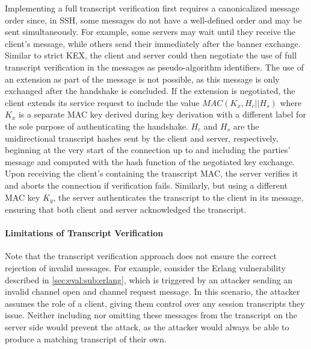 Implementing a full transcript verification first requires a canonicalized message order since, in SSH, some messages do not have a well-defined order and may be sent simultaneously. For example, some servers may wait until they receive the client's \msgkexinit message, while others send their \msgkexinit immediately after the banner exchange. Similar to strict KEX, the client and server could then negotiate the use of full transcript verification in the \msgkexinit messages as pseudo-algorithm identifiers. The use of an extension as part of the \msgextinfo message is not possible, as this message is only exchanged after the handshake is concluded. If the extension is negotiated, the client extends its service request to include the value $MAC(K_x, H_c || H_s)$ where $K_x$ is a separate MAC key derived during key derivation with a different label for the sole purpose of authenticating the handshake. $H_c$ and $H_s$ are the unidirectional transcript hashes sent by the client and server, respectively, beginning at the very start of the connection up to and including the parties' \msgnewkeys message and computed with the hash function of the negotiated key exchange. Upon receiving the client's \msgservicerequest containing the transcript MAC, the server verifies it and aborts the connection if verification fails. Similarly, but using a different MAC key $K_y$, the server authenticates the transcript to the client in its \msgserviceaccept message, ensuring that both client and server acknowledged the transcript.

\paragraph{Limitations of Transcript Verification}

Note that the transcript verification approach does not ensure the correct rejection of invalid messages. For example, consider the Erlang vulnerability described in \autoref{sec:eval:sub:erlang}, which is triggered by an attacker sending an invalid channel open and channel request message. In this scenario, the attacker assumes the role of a client, giving them control over any session transcripts they issue. Neither including nor omitting these messages from the transcript on the server side would prevent the attack, as the attacker would always be able to produce a matching transcript of their own.
